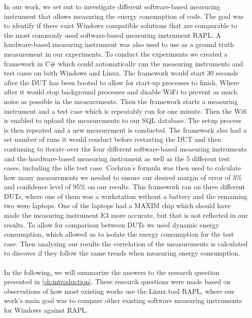 In our work, we set out to investigate different software-based measuring instrument that allows measuring the energy consumption of code. The goal was to identify if there exist Windows compatible solutions that are comparable to the most commonly used software-based measuring instrument RAPL. A hardware-based measuring instrument was also used to use as a ground truth measurement in our experiments. To conduct the experiments we created a framework in C\# which could automatically run the measuring instruments and test cases on both Windows and Linux. The framework would start 30 seconds after the DUT has been booted to allow for start-up processes to finish. Where after it would stop background processes and disable WiFi to prevent as much noise as possible in the measurements. Then the framework starts a measuring instrument and a test case which is repeatably run for one minute. Then the Wifi is enabled to upload the measurements to our SQL database. The setup process is then repeated and a new measurement is conducted. The framework also had a set number of runs it would conduct before restarting the DUT and then continuing to iterate over the four different software-based measuring instruments and the hardware-based measuring instrument as well as the 5 different test cases, including the idle test case. Cochran's formula was then used to calculate how many measurements we needed to ensure our desired margin of error of 3\% and confidence level of 95\% on our results. This framework ran on three different DUTs, where one of them was a workstation without a battery and the remaining two were laptops. One of the laptops had a MAXIM chip which should have made the measuring instrument E3 more accurate, but that is not reflected in our results. To allow for comparison between DUTs we used dynamic energy consumption, which allowed us to isolate the energy consumption for the test case. Then analyzing our results the correlation of the measurements is calculated to discover if they follow the same trends when measuring energy consumption.

\paragraph*{}
In the following, we will summarize the answers to the research question presented in \cref{ch:introduction}. These research questions were made based on observations of how most existing works use the Linux tool RAPL, where our work's main goal was to compare other existing software measuring instruments for Windows against RAPL. 


